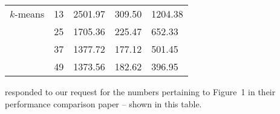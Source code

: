\begin{table}[p]
{\begin{threeparttable}
\begin{tabular}{l r | l l l}
		$k$-means
		& 13 & 2501.97 & 309.50 & 1204.38 \\
        & 25 & 1705.36 & 225.47 & 652.33  \\
        & 37 & 1377.72 & 177.12 & 501.45  \\
        & 49 & 1373.56 & 182.62 & 396.95  \\
        \bottomrule
      \end{tabular}
      \normalsize
      \begin{tablenotes}
        \source \citeauthor{VEIGA:EVALUATION:2015} \cite{VEIGA:EVALUATION:2015} responded to our request for the numbers pertaining to Figure~1 in their performance comparison paper -- shown in this table.
      \end{tablenotes}
    \end{threeparttable}}
  \end{table}

